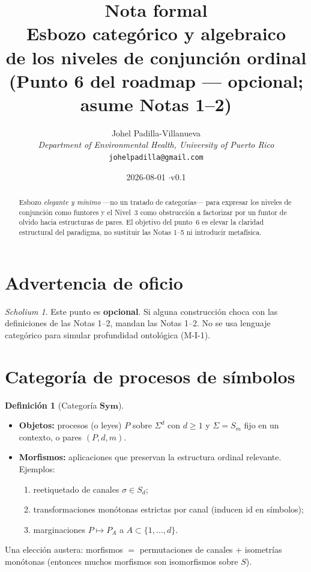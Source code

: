 \documentclass[11pt,a4paper]{article}
\title{\textbf{Nota formal}\\[0.4em]
\large Esbozo categ\'orico y algebraico\\
de los niveles de conjunci\'on ordinal\\[0.6em]
\normalsize (Punto 6 del roadmap --- opcional; asume Notas 1--2)}
\author{
Johel Padilla-Villanueva\\
\textit{Department of Environmental Health, University of Puerto Rico}\\
\texttt{johelpadilla@gmail.com}
}
\date{2026-08-01 \quad$\cdot$\quad v0.1}
\theoremstyle{definition}
\newtheorem{definition}{Definici\'on}[section]
\theoremstyle{plain}
\theoremstyle{remark}
\newtheorem{scholium}{Scholium}[section]
\begin{document}
\maketitle

\begin{abstract}
Esbozo \emph{elegante y m\'inimo} ---no un tratado de categor\'ias---
para expresar los niveles de conjunci\'on como funtores y el Nivel~3
como obstrucci\'on a factorizar por un funtor de olvido hacia estructuras
de pares. El objetivo del punto~6 es elevar la claridad estructural del
paradigma, no sustituir las Notas 1--5 ni introducir metaf\'isica.
\end{abstract}

\tableofcontents
\vspace{1em}

\section{Advertencia de oficio}
\label{sec:warn}

\begin{scholium}
Este punto es \textbf{opcional}. Si alguna construcci\'on choca con las
definiciones de las Notas 1--2, mandan las Notas 1--2.
No se usa lenguaje categ\'orico para simular profundidad ontológica
(M-I-1).
\end{scholium}

\section{Categor\'ia de procesos de s\'imbolos}
\label{sec:cat}

\begin{definition}[Categor\'ia $\mathbf{Sym}$]
\label{def:Sym}
\begin{itemize}
  \item \textbf{Objetos:} procesos (o leyes) $P$ sobre $\Sigma^d$ con
  $d\ge 1$ y $\Sigma=S_m$ fijo en un contexto, o pares
  $(P,d,m)$.
  \item \textbf{Morfismos:} aplicaciones que preservan la estructura
  ordinal relevante. Ejemplos:
  \begin{enumerate}[label=(\alph*)]
    \item reetiquetado de canales $\sigma\in S_d$;
    \item transformaciones mon\'otonas estrictas por canal (inducen
    $\mathrm{id}$ en s\'imbolos);
    \item marginaciones $P\mapsto P_A$ a $A\subset\{1,\ldots,d\}$.
  \end{enumerate}
\end{itemize}
Una elecci\'on austera: morfismos $=$ permutaciones de canales +
isometr\'ias mon\'otonas (entonces muchos morfismos son isomorfismos
sobre $S$).
\end{definition}
\end{document}
